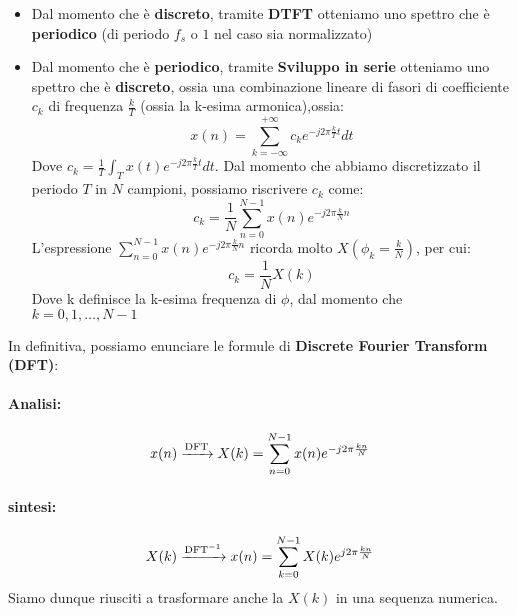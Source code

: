 \begin{itemize}
    \item Dal momento che è \textbf{discreto}, tramite \textbf{DTFT} otteniamo uno spettro che è \textbf{periodico} (di periodo $f_s$ o $1$ nel caso sia normalizzato)
    \item Dal momento che è \textbf{periodico}, tramite \textbf{Sviluppo in serie} otteniamo uno spettro che è \textbf{discreto}, ossia una combinazione lineare di fasori di coefficiente $c_k$ di frequenza $\frac{k}{T}$ (ossia la k-esima armonica),ossia:
    \begin{equation*}
        x(n) = \sum_{k = -\infty}^{+\infty} c_k e^{-j2\pi \frac{k}{T}t} dt
    \end{equation*}
    Dove $c_k = \frac{1}{T}\int_{T} x(t)e^{-j2\pi \frac{k}{T}t}dt$. Dal momento che abbiamo discretizzato il periodo $T$ in $N$ campioni,
    possiamo riscrivere $c_k$ come:
    \begin{equation*}
        c_k = \frac{1}{N} \sum_{n = 0}^{N - 1} x(n) e^{-j2\pi \frac{k}{N}n}
    \end{equation*}
    L'espressione $\sum_{n = 0}^{N - 1} x(n) e^{-j2\pi \frac{k}{N}n}$ ricorda molto $X\left(\phi_k = \frac{k}{N}\right)$, per cui:
    \begin{equation*}
        c_k = \frac{1}{N} X(k)
    \end{equation*}
    Dove k definisce la k-esima frequenza di $\phi$, dal momento che $k = 0, 1, \dots, N-1$
\end{itemize}
In definitiva, possiamo enunciare le formule di \textbf{Discrete Fourier Transform (DFT)}:
\paragraph{Analisi:}
\begin{equation}
    x(n) \xrightarrow{\text{DFT}} X(k) = \sum_{n = 0}^{N - 1}x(n)e^{-j2\pi \frac{kn}{N}}
\end{equation}
\paragraph{sintesi:}
\begin{equation}
    X(k) \xrightarrow{\text{DFT}^{-1}} x(n) = \sum_{k = 0}^{N - 1}X(k)e^{j2\pi \frac{kn}{N}}
\end{equation}
Siamo dunque riusciti a trasformare anche la $X(k)$ in una sequenza numerica.



